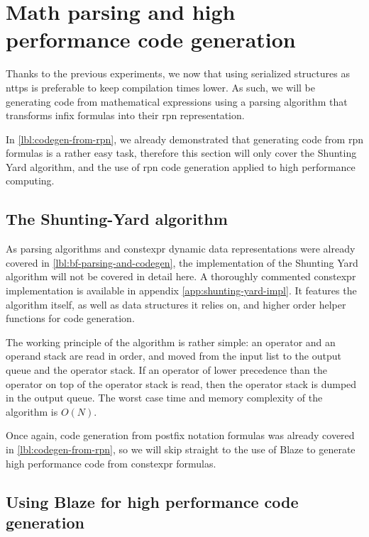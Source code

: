 \documentclass[../main]{subfiles}
\begin{document}

\section{
  Math parsing and high performance code generation
}

Thanks to the previous experiments, we now that using serialized structures
as \glspl{nttp} is preferable to keep compilation times lower.
As such, we will be generating code from mathematical expressions using
a parsing algorithm that transforms infix formulas into their \gls{rpn}
representation.

In \ref{lbl:codegen-from-rpn}, we already demonstrated that generating code
from \gls{rpn} formulas is a rather easy task, therefore this section
will only cover the Shunting Yard algorithm, and the use of \gls{rpn}
code generation applied to high performance computing.

\subsection{
  The Shunting-Yard algorithm
}

As parsing algorithms and \gls{constexpr} dynamic data representations were
already covered in \ref{lbl:bf-parsing-and-codegen}, the implementation of
the Shunting Yard algorithm will not be covered in detail here.
A thoroughly commented \gls{constexpr} implementation is available in appendix
\ref{app:shunting-yard-impl}. It features the algorithm itself, as well as
data structures it relies on, and higher order helper functions
for code generation.

The working principle of the algorithm is rather simple:
an operator and an operand stack are read in order, and moved
from the input list to the output queue and the operator stack.
If an operator of lower precedence than the operator on top of the
operator stack is read, then the operator stack is dumped in the output queue.
The worst case time and memory complexity of the algorithm is $O(N)$.

Once again, code generation from postfix notation formulas was already covered
in \ref{lbl:codegen-from-rpn}, so we will skip straight to the use of Blaze
to generate high performance code from \gls{constexpr} formulas.

\subsection{
  Using Blaze for high performance code generation
}
\end{document}
